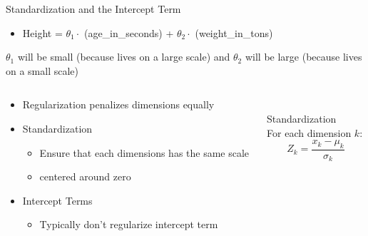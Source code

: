 \documentclass[aspectratio=169]{../latex_main/tntbeamer}  %
\begin{document}
	\begin{frame}{Standardization and the Intercept Term}
	    \begin{itemize}
	        \item Height = $\theta_1 \cdot$  (age\_in\_seconds) + $\theta_2\cdot$ (weight\_in\_tons)
	    \end{itemize}
	    $\theta_1$ will be small (because lives on a large scale)  and  $\theta_2$ will be large (because lives on a small scale)
	    \begin{columns}
	        \begin{column}{.5\textwidth}
	                \begin{itemize}
	                    \item \alert{Regularization penalizes dimensions equally}
	                    \item Standardization
	                    \begin{itemize}
	                        \item Ensure that each dimensions has the same scale
	                        \item centered around zero
	                    \end{itemize}
	                    \item Intercept Terms
	                    \begin{itemize}
	                        \item Typically don’t regularize intercept term 
	                    \end{itemize}
	                \end{itemize}
	        \end{column}
	        
	        \begin{column}{.4\textwidth}
	                \\ 
	                Standardization\\
	                For each dimension $k$:
	                \begin{equation*}
	                    Z_k = \frac{x_k - \mu_k}{\sigma_k}
	                \end{equation*}
	        \end{column}
	    \end{columns}
	\end{frame}
	
\end{document}
